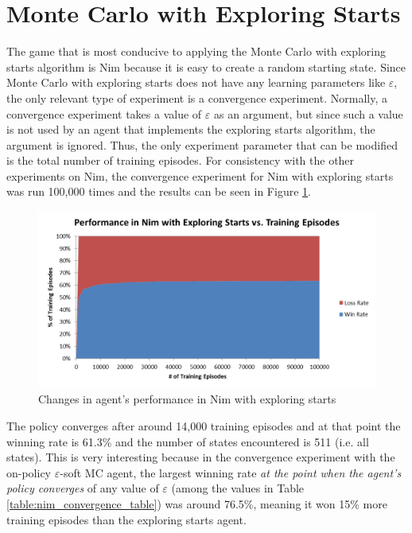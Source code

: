 \documentclass[11pt,a4paper]{report}
\begin{document}
\section{Monte Carlo with Exploring Starts}

The game that is most conducive to applying the Monte Carlo with exploring starts algorithm is Nim because it is easy to create a random starting state. Since Monte Carlo with exploring starts does not have any learning parameters like $\varepsilon$, the only relevant type of experiment is a convergence experiment. Normally, a convergence experiment takes a value of $\varepsilon$ as an argument, but since such a value is not used by an agent that implements the exploring starts algorithm, the argument is ignored. Thus, the only experiment parameter that can be modified is the total number of training episodes. For consistency with the other experiments on Nim, the convergence experiment for Nim with exploring starts was run 100,000 times and the results can be seen in Figure \ref{nim-exploring-starts-convergence}.

\begin{figure}[htbp]
	\begin{center}
		\includegraphics[width=125mm]{NimExploringStarts_Convergence.png}
		\caption{Changes in agent's performance in Nim with exploring starts}
		\label{nim-exploring-starts-convergence}
	\end{center}
\end{figure}

The policy converges after around 14,000 training episodes and at that point the winning rate is 61.3\% and the number of states encountered is 511 (i.e. all states). This is very interesting because in the convergence experiment with the on-policy $\varepsilon$-soft MC agent, the largest winning rate \emph{at the point when the agent's policy converges} of any value of $\varepsilon$ (among the values in Table \ref{table:nim_convergence_table}) was around 76.5\%, meaning it won 15\% more training episodes than the exploring starts agent.
\end{document}
